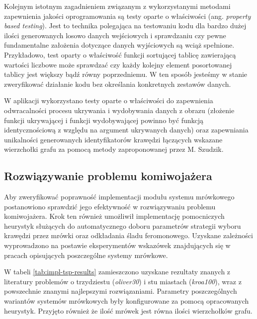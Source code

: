 {{        Kolejnym istotnym zagadnieniem związanym z wykorzystanymi metodami zapewnienia jakości oprogramowania są testy
        oparte o właściwości (ang. \textit{property based testing}). Jest to technika polegająca na testowaniu kodu dla
        bardzo dużej ilości generowanych losowo danych wejściowych i sprawdzaniu czy pewne fundamentalne założenia
        dotyczące danych wyjściowych są wciąż spełnione. Przykładowo, test oparty o właściwość funkcji sortującej
        tablicę zawierającą wartości liczbowe może sprawdzać czy każdy kolejny element posortowanej tablicy jest większy
        bądź równy poprzedniemu. W ten sposób jesteśmy w stanie zweryfikować działanie kodu bez określania konkretnych
        zestawów danych.

        W aplikacji wykorzystano testy oparte o właściwości do zapewnienia odwracalności procesu ukrywania i wydobywania
        danych z obrazu (złożenie funkcji ukrywającej i funkcji wydobywającej powinno być funkcją identycznościową z
        względu na argument ukrywanych danych) oraz zapewniania unikalności generowanych identyfikatorów krawędzi
        łączących wskazane wierzchołki grafu za pomocą metody zaproponowanej przez M. Szudzik\cite{SzudzikFn}.

        \subsection{Rozwiązywanie problemu komiwojażera}
        {
            Aby zweryfikować poprawność implementacji modułu systemu mrówkowego postanowiono sprawdzić jego efektywność
            w rozwiązywaniu problemu komiwojażera. Krok ten również umożliwił implementację pomocniczych heurystyk
            służących do automatycznego doboru parametrów strategii wyboru krawędzi przez mrówki oraz odkładania śladu
            feromonowego. Uzyskane zależności wyprowadzono na postawie eksperymentów wskazówek znajdujących się w
            pracach opisujących poszczególne systemy mrówkowe\cite{Dorigo1991AntSA, Dorigo1997AntCS,
            Sttzle2000MAXMINAS}.

            W tabeli \ref{tab:impl-tsp-results} zamieszczono uzyskane rezultaty znanych z literatury problemów o
            trzydziestu (\textit{oliver30}) i stu miastach (\textit{kroa100}), wraz z powszechnie znanymi najlepszymi
            rozwiązaniami. Parametry poszczególnych wariantów systemów mrówkowych były konfigurowane za pomocą
            opracowanych heurystyk. Przyjęto również że ilość mrówek jest równa ilości wierzchołków grafu.

}}}
